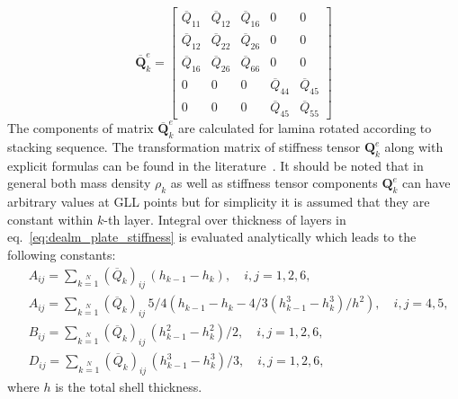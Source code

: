 \documentclass[preprint,12pt]{elsarticle}
\renewcommand{\bm}[1]{\mathbf{#1}}
\begin{document}
	\begin{equation}
	\bm{\overline Q}_k^e = \left[\begin{array}{ccccc} \overline{Q}_{11} & \overline{Q}_{12}& \overline{Q}_{16} & 0&0\\[2pt]
	\overline{Q}_{12}& \overline{Q}_{22} & \overline{Q}_{26}& 0&0\\\overline{Q}_{16}&\overline{Q}_{26}&\overline{Q}_{66}&0&0\\[2pt]
	0& 0 &0&\overline{Q}_{44}& \overline{Q}_{45}\\[2pt]
	0&0&0&\overline{Q}_{45}&\overline{Q}_{55}\end{array}\right] \label{eq:dealm_plate_stf}
	\end{equation}
	The components of matrix $\bm{\overline Q}_k^e$ are calculated for lamina rotated according to stacking sequence. The transformation matrix of stiffness tensor $\bm{Q}_k^e$ along with explicit formulas can be found in the literature~\cite{Vinson1987}.
	It should be noted that in general both mass density $\rho_k$ as well as stiffness tensor components $\bm{Q}_k^e$ can have arbitrary values at GLL points but for simplicity it is assumed that they are constant within $k$-th layer. Integral over thickness of layers in eq.~\ref{eq:dealm_plate_stiffness} is evaluated analytically which leads to the following constants:
	\begin{equation}
	\begin{split}
	& A_{ij} =  \sum \limits_{k=1}\limits^{N} (\overline{Q}_k)_{ij} \,(h_{k-1} - h_k),\quad i,j = 1,2,6,\\
	& A_{ij} =  \sum \limits_{k=1}\limits^{N} (\overline{Q}_k)_{ij} \,5/4 (h_{k-1} - h_k - 4/3 (h_{k-1}^3 - h_k^3)/h^2 ),\quad i,j = 4,5,\\
	& B_{ij} = \sum \limits_{k=1}\limits^{N}(\overline{Q}_k)_{ij} \,(h_{k-1}^2 - h_k^2)/2, \quad i,j = 1,2,6,\\
	& D_{ij} = \sum \limits_{k=1}\limits^{N}(\overline{Q}_k)_{ij} \,(h_{k-1}^3 - h_k^3)/3, \quad i,j = 1,2,6,
	\end{split}
	\end{equation}
	where $h$ is the total shell thickness.
\end{document}
